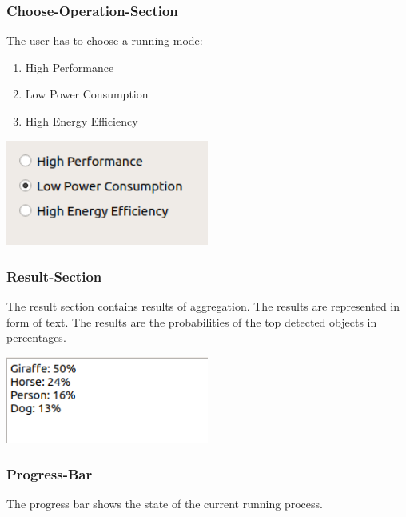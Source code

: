 \documentclass[parskip=full]{scrartcl}
\begin{document}
\pagebreak



\subsubsection {Choose-Operation-Section}

 The user has to choose a running mode:

\begin{enumerate}
	\item High Performance
	\item Low Power Consumption
	\item High Energy Efficiency
\end{enumerate}

\begin{center}
\includegraphics[width=0.5\textwidth]{images/ChooseOperationMode.png}
\end{center}

\subsubsection {Result-Section}

The result section contains results of aggregation. The results are represented in form of text. The results are the probabilities of the top detected objects in percentages.

\begin{center}
\includegraphics[width=0.5\textwidth]{images/ResultSection.png}
\end{center}

\subsubsection {Progress-Bar}

The progress bar shows the state of the current running process.
\end{document}
